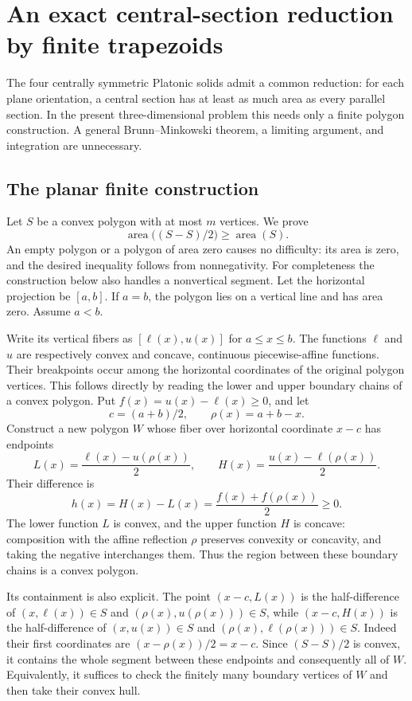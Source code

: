 \section{An exact central-section reduction by finite trapezoids}
The four centrally symmetric Platonic solids admit a common reduction:
for each plane orientation, a central section has at least as much area
as every parallel section.  In the present three-dimensional problem
this needs only a finite polygon construction.  A general
Brunn--Minkowski theorem, a limiting argument, and integration are
unnecessary.

\subsection{The planar finite construction}
Let $S$ be a convex polygon with at most $m$ vertices.  We prove
\[
 \operatorname{area}\bigl((S-S)/2\bigr)
 \ge \operatorname{area}(S).
\]
An empty polygon or a polygon of area zero causes no difficulty: its
area is zero, and the desired inequality follows from nonnegativity.
For completeness the construction below also handles a nonvertical
segment.  Let the horizontal projection be $[a,b]$.  If $a=b$, the
polygon lies on a vertical line and has area zero.  Assume $a<b$.

Write its vertical fibers as $[\ell(x),u(x)]$ for $a\le x\le b$.
The functions $\ell$ and $u$ are respectively convex and concave,
continuous piecewise-affine functions.  Their breakpoints occur among
the horizontal coordinates of the original polygon vertices.  This
follows directly by reading the lower and upper boundary chains of a
convex polygon.  Put $f(x)=u(x)-\ell(x)\ge0$, and let
\[
 c=(a+b)/2,\qquad \rho(x)=a+b-x.
\]
Construct a new polygon $W$ whose fiber over horizontal coordinate
$x-c$ has endpoints
\[
 L(x)=\frac{\ell(x)-u(\rho(x))}{2},\qquad
 H(x)=\frac{u(x)-\ell(\rho(x))}{2}.
\]
Their difference is
\[
 h(x)=H(x)-L(x)
      =\frac{f(x)+f(\rho(x))}{2}\ge0.                 \tag{CS1}
\]
The lower function $L$ is convex, and the upper function $H$ is
concave: composition with the affine reflection $\rho$ preserves
convexity or concavity, and taking the negative interchanges them.
Thus the region between these boundary chains is a convex polygon.

Its containment is also explicit.  The point $(x-c,L(x))$ is the
half-difference of $(x,\ell(x))\in S$ and
$(\rho(x),u(\rho(x)))\in S$, while $(x-c,H(x))$ is the
half-difference of $(x,u(x))\in S$ and
$(\rho(x),\ell(\rho(x)))\in S$.  Indeed their first coordinates
are $(x-\rho(x))/2=x-c$.  Since $(S-S)/2$ is convex, it contains the
whole segment between these endpoints and consequently all of $W$.
Equivalently, it suffices to check the finitely many boundary vertices
of $W$ and then take their convex hull.

